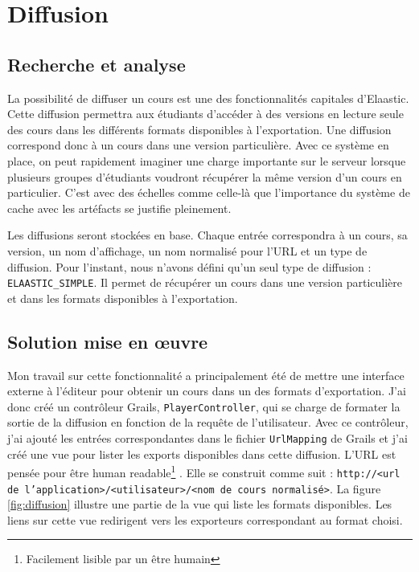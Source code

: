 \section{Diffusion}
\subsection{Recherche et analyse}
La possibilité de diffuser un cours est une des fonctionnalités capitales
d'Elaastic. Cette diffusion permettra aux étudiants d'accéder à des versions en
\og lecture seule \fg{} des cours dans les différents formats disponibles à
l'exportation. Une diffusion correspond donc à un cours dans une version
particulière. Avec ce système en place, on peut rapidement imaginer une charge
importante sur le serveur lorsque plusieurs groupes d'étudiants voudront
récupérer la même version d'un cours en particulier. C'est avec des échelles
comme celle-là que l'importance du système de cache avec les artéfacts se
justifie pleinement.

Les diffusions seront stockées en base. Chaque entrée correspondra à un cours, sa version, un
nom d'affichage, un nom normalisé pour l'URL et un type de diffusion. Pour
l'instant, nous n'avons défini qu'un seul type de diffusion : {\tt
ELAASTIC\_SIMPLE}. Il permet de
récupérer un cours dans une version particulière et dans les formats disponibles
à l'exportation.

\subsection{Solution mise en \oe uvre}
Mon travail sur cette fonctionnalité a principalement été de mettre une interface
\og externe \fg{} à l'éditeur pour obtenir un cours dans un des formats
d'exportation. J'ai donc créé un contrôleur Grails, {\tt PlayerController}, qui
se charge de formater la sortie de la diffusion en fonction de la requête de
l'utilisateur. Avec ce contrôleur, j'ai ajouté les entrées correspondantes dans
le fichier {\tt UrlMapping} de Grails et j'ai créé une vue pour lister les
exports disponibles dans cette diffusion. L'URL est pensée pour être \og human
readable\footnote{Facilement lisible par un être humain} \fg{}. Elle se
construit comme suit : {\tt http://<url de l'application>/<utilisateur>/<nom de cours
normalisé>}. La figure \ref{fig:diffusion} illustre une partie de la vue qui
liste les formats disponibles. Les liens sur cette vue redirigent vers les
exporteurs correspondant au format choisi.

